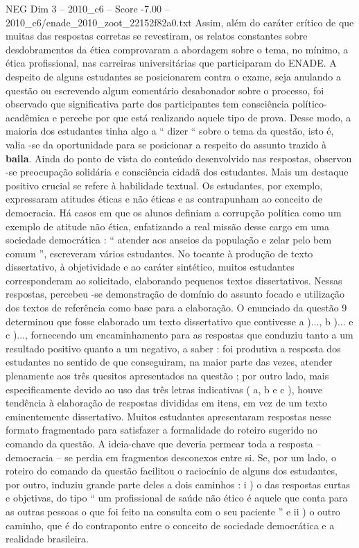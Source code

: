 \begin{textsample}{NEG Dim 3 – 2010\_c6 – Score -7.00 – 2010\_c6/enade\_2010\_zoot\_22152f82a0.txt}
Assim, além do caráter crítico de que muitas das respostas corretas se revestiram, os relatos constantes sobre desdobramentos da ética comprovaram a abordagem sobre o tema, no mínimo, a ética profissional, nas carreiras universitárias que participaram do ENADE.
A despeito de alguns estudantes se posicionarem contra o exame, seja anulando a questão ou escrevendo algum comentário desabonador sobre o processo, foi observado que significativa parte dos participantes tem consciência político-acadêmica e percebe por que está realizando aquele tipo de prova.
Desse modo, a maioria dos estudantes tinha algo a “ dizer “ sobre o tema da questão, isto é, valia -se da oportunidade para se posicionar a respeito do assunto trazido à \textbf{baila}.
Ainda do ponto de vista do conteúdo desenvolvido nas respostas, observou -se preocupação solidária e consciência cidadã dos estudantes.
Mais um destaque positivo crucial se refere à habilidade textual.
Os estudantes, por exemplo, expressaram atitudes éticas e não éticas e as contrapunham ao conceito de democracia.
Há casos em que os alunos definiam a corrupção política como um exemplo de atitude não ética, enfatizando a real missão desse cargo em uma sociedade democrática : “ atender aos anseios da população e zelar pelo bem comum ”, escreveram vários estudantes.
No tocante à produção de texto dissertativo, à objetividade e ao caráter sintético, muitos estudantes corresponderam ao solicitado, elaborando pequenos textos dissertativos.
Nessas respostas, percebeu -se demonstração de domínio do assunto focado e utilização dos textos de referência como base para a elaboração.
O enunciado da questão 9 determinou que fosse elaborado um texto dissertativo que contivesse a )..., b )... e c )..., fornecendo um encaminhamento para as respostas que conduziu tanto a um resultado positivo quanto a um negativo, a saber : foi produtiva a resposta dos estudantes no sentido de que conseguiram, na maior parte das vezes, atender plenamente aos três quesitos apresentados na questão ; por outro lado, mais especificamente devido ao uso das três letras indicativas ( a, b e c ), houve tendência à elaboração de respostas divididas em itens, em vez de um texto eminentemente dissertativo.
Muitos estudantes apresentaram respostas nesse formato fragmentado para satisfazer a formalidade do roteiro sugerido no comando da questão.
A ideia-chave que deveria permear toda a resposta – democracia – se perdia em fragmentos desconexos entre si.
Se, por um lado, o roteiro do comando da questão facilitou o raciocínio de alguns dos estudantes, por outro, induziu grande parte deles a dois caminhos : i ) o das respostas curtas e objetivas, do tipo “ um profissional de saúde não ético é aquele que conta para as outras pessoas o que foi feito na consulta com o seu paciente ” e ii ) o outro caminho, que é do contraponto entre o conceito de sociedade democrática e a realidade brasileira.

\end{textsample}

